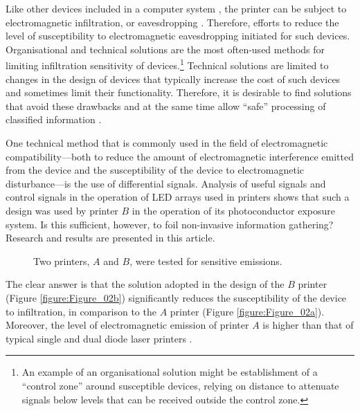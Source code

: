\documentclass[12pt,a4paper]{article}
\begin{document}
Like other devices included in a computer system \cite{Kuhn2002,Kubiak2016a},
the printer can be subject to electromagnetic infiltration, or eavesdropping
\cite{Ketenci2015a,Kubiak2016b}. Therefore, efforts to reduce the level of
susceptibility to electromagnetic eavesdropping initiated for such devices.
Organisational and technical solutions \cite{Kubiak2006a} are the most
often-used methods for limiting infiltration
sensitivity of devices.\footnote{An example of an organisational solution
might be establishment of a ``control zone'' around susceptible devices,
relying on distance to attenuate signals below levels that can be received
outside the control zone.} Technical solutions are limited to changes in the
design of devices that typically increase the cost of such devices and
sometimes limit their functionality. Therefore, it is desirable to find
solutions that avoid these drawbacks and at the same time allow ``safe''
processing of classified information \cite{Wasfy2011a,Goel2012a}.

One technical method that is commonly used in the field of electromagnetic
compatibility---both to reduce the amount of electromagnetic interference
emitted from the device and the susceptibility of the device to
electromagnetic disturbance---is the use of differential signals. Analysis
of useful signals and control signals \cite{Kubiak2017d} in the operation of
LED arrays
used in printers shows that such a design was used by printer $B$ in the
operation of its photoconductor exposure system. Is this sufficient, however,
to foil non-invasive information gathering? Research and results are
presented in this article.

\begin{figure*}[ht]
    \centering
    \hfil
    \caption{Two printers, $A$ and $B$, were tested for sensitive emissions.}
    \label{figure:Figure_02}
\end{figure*}

The clear answer is that the solution adopted in the design of the $B$
printer (Figure \ref{figure:Figure_02b}) significantly reduces the
susceptibility of the device to infiltration, in comparison to the $A$
printer (Figure \ref{figure:Figure_02a}). Moreover, the level of
electromagnetic emission of printer $A$ is higher than that of
typical single and dual diode laser printers \cite{Kubiak2014b}.
\end{document}
